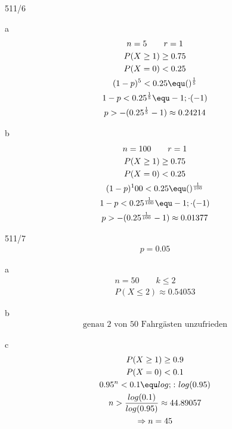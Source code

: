 \begin{exercise}{511/6}
  \item [a]
  \begin{gather*}
    n = 5 \qquad r = 1 \\
    P(X \geq 1) \geq 0.75 \\
    P(X = 0) < 0.25 \\
    (1 - p)^5 < 0.25 \equ ()^\frac{1}{5} \\
    1 - p < 0.25^\frac{1}{5} \equ -1; \cdot (-1) \\
    p > -(0.25^\frac{1}{5} - 1) \approx 0.24214
  \end{gather*}
  \item [b]
  \begin{gather*}
    n = 100 \qquad r = 1 \\
    P(X \geq 1) \geq 0.75 \\
    P(X = 0) < 0.25 \\
    (1 - p)^100 < 0.25 \equ ()^\frac{1}{100} \\
    1 - p < 0.25^\frac{1}{100} \equ -1; \cdot (-1) \\
    p > -(0.25^\frac{1}{100} - 1) \approx 0.01377
  \end{gather*}
\end{exercise}
\begin{exercise}{511/7}
  \begin{gather*}
    p = 0.05
  \end{gather*}
  \item [a]
  \begin{gather*}
    n = 50 \qquad k \leq 2 \\
    P(X \leq 2) \approx 0.54053
  \end{gather*}
  \item [b]
  \begin{gather*}
    \text{genau $2$ von $50$ Fahrgästen unzufrieden}
  \end{gather*}
  \item [c]
  \begin{gather*}
    P(X \geq 1) \geq 0.9 \\
    P(X = 0) < 0.1 \\
    0.95^n < 0.1 \equ log; \colon log(0.95) \\
    n > \frac{log(0.1)}{log(0.95)} \approx 44.89057 \\
    \Rightarrow n = 45
  \end{gather*}
\end{exercise}
